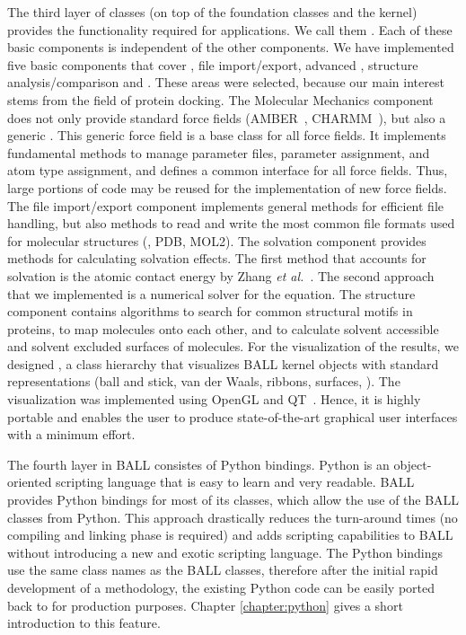 The third layer of classes (on top of the foundation classes and the kernel)
provides the functionality required for applications. We call them
. Each of these basic components is independent of
the other components.  We have implemented five basic components that cover
, file import/export, advanced , structure analysis/comparison and . These
areas were selected, because our main interest stems from the field of protein
docking. The Molecular Mechanics component does not only provide standard
force fields (AMBER~\cite{AMBER95}, CHARMM~\cite{BBO+83}), but also a generic
.  This generic force field is a base class for all force
fields. It implements fundamental methods to manage parameter files, parameter
assignment, and atom type assignment, and defines a common interface for all
force fields. Thus, large portions of code may be reused for the
implementation of new force fields.  The file import/export component
implements general methods for efficient file handling, but also methods to
read and write the most common file formats used for molecular structures
(\eg, PDB, MOL2). The solvation component provides methods for calculating
solvation effects. The first method that accounts for solvation is the atomic
contact energy by Zhang {\it et al.}~\cite{ZVC+97}. The second approach that
we implemented is a numerical solver for the  equation.  The
structure component contains algorithms to search for common structural motifs
in proteins, to map molecules onto each other, and to calculate solvent
accessible and solvent excluded surfaces of molecules. For the visualization
of the results, we designed , a class hierarchy that
visualizes BALL kernel objects with standard representations (ball and stick,
van der Waals, ribbons, surfaces, \etc). The visualization was implemented
using OpenGL and QT~\cite{QT}. Hence, it is highly portable and enables the
user to produce state-of-the-art graphical user interfaces with a minimum
effort.

The fourth layer in BALL consistes of Python bindings. Python is an
object-oriented scripting language that is easy to learn and very readable.
BALL provides Python bindings for most of its classes, which allow the use of
the BALL \CPP classes from Python. This approach drastically reduces the
turn-around times (no compiling and linking phase is required) and adds
scripting capabilities to BALL without introducing a new and exotic scripting
language. The Python bindings use the same class names as the BALL classes,
therefore after the initial rapid development of a methodology, the existing
Python code can be easily ported back to \CPP for production purposes.
Chapter \ref{chapter:python} gives a short introduction to this feature.
